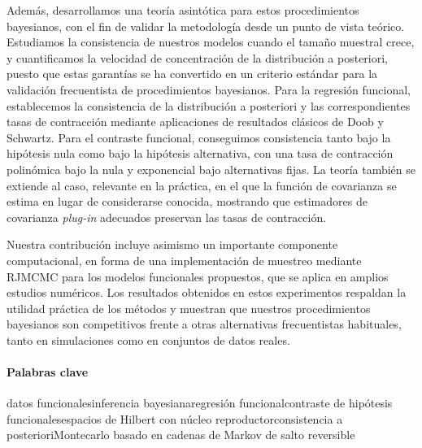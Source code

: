 Además, desarrollamos una teoría asintótica para estos procedimientos bayesianos, con el fin de validar la metodología desde un punto de vista teórico. Estudiamos la consistencia de nuestros modelos cuando el tamaño muestral crece, y cuantificamos la velocidad de concentración de la distribución a posteriori, puesto que estas garantías se ha convertido en un criterio estándar para la validación frecuentista de procedimientos bayesianos. Para la regresión funcional, establecemos la consistencia de la distribución a posteriori y las correspondientes tasas de contracción mediante aplicaciones de resultados clásicos de Doob y Schwartz. Para el contraste funcional, conseguimos consistencia tanto bajo la hipótesis nula como bajo la hipótesis alternativa, con una tasa de contracción polinómica bajo la nula y exponencial bajo alternativas fijas. La teoría también se extiende al caso, relevante en la práctica, en el que la función de covarianza se estima en lugar de considerarse conocida, mostrando que estimadores de covarianza \textit{plug-in} adecuados preservan las tasas de contracción.

Nuestra contribución incluye asimismo un importante componente computacional, en forma de una implementación de muestreo mediante \acs{RJMCMC} para los modelos funcionales propuestos, que se aplica en amplios estudios numéricos. Los resultados obtenidos en estos experimentos respaldan la utilidad práctica de los métodos y muestran que nuestros procedimientos bayesianos son competitivos frente a otras alternativas frecuentistas habituales, tanto en simulaciones como en conjuntos de datos reales.

\paragraph{Palabras clave}
datos funcionales\qquad inferencia bayesiana\qquad regresión funcional\qquad contraste de hipótesis funcionales\qquad espacios de Hilbert con núcleo reproductor\qquad consistencia a posteriori\qquad Montecarlo basado en cadenas de Markov de salto reversible


\endgroup
